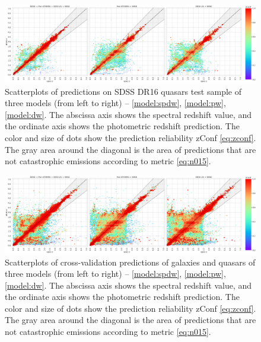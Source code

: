 \documentclass[fleqn,usenatbib]{mnras}
\begin{document}
\begin{figure}
    \centering
    \includegraphics[width=0.99\linewidth]{images/scatterplots-dr16q-wo-train-sorted.png}
    \caption{Scatterplots of predictions on SDSS DR16 quasars test sample of three models (from left to right) -- \ref{model:spdw}, \ref{model:pw}, \ref{model:dw}. The abscissa axis shows the spectral redshift value, and the ordinate axis shows the photometric redshift prediction. The color and size of dots show the prediction reliability zConf \eqref{eq:zconf}. The gray area around the diagonal is the area of predictions that are not catastrophic emissions according to metric \eqref{eq:n015}.}
    \label{fig:scatter-dr16q_wo_train}
\end{figure}

\begin{figure}
    \centering
    \includegraphics[width=0.99\linewidth]{images/scatterplots-cv2-total-sorted.png}
    \caption{Scatterplots of cross-validation predictions of galaxies and quasars of three models (from left to right) -- \ref{model:spdw}, \ref{model:pw}, \ref{model:dw}. The abscissa axis shows the spectral redshift value, and the ordinate axis shows the photometric redshift prediction. The color and size of dots show the prediction reliability zConf \eqref{eq:zconf}. The gray area around the diagonal is the area of predictions that are not catastrophic emissions according to metric \eqref{eq:n015}.}
    \label{fig:scatter-cv2-total}
\end{figure}
\end{document}
